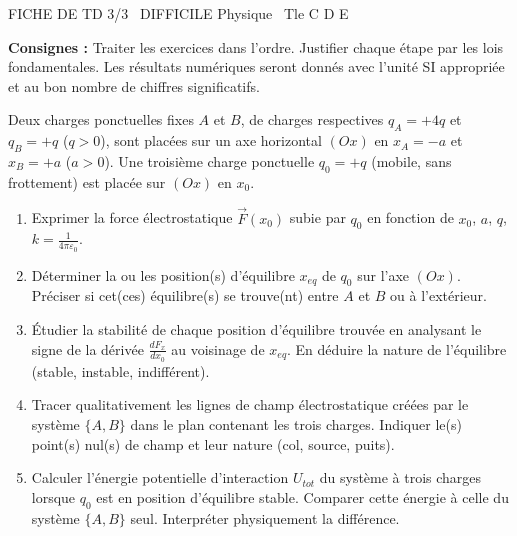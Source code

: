 \documentclass[11pt]{article}
\begin{document}
\begin{tcolorbox}[enhanced,colback=popink,colframe=popink,arc=10pt,boxrule=0pt,left=12pt,right=12pt,top=9pt,bottom=9pt]
{\color{white}\popxbold\small FICHE DE TD 3/3 \textbullet\ DIFFICILE \hfill Physique \textbullet\ Tle C D E\par}
\end{tcolorbox}
\vspace{4pt}
\noindent\textbf{Consignes :} Traiter les exercices dans l'ordre. Justifier chaque étape par les lois fondamentales. Les résultats numériques seront donnés avec l'unité SI appropriée et au bon nombre de chiffres significatifs.

\begin{exercice}
Deux charges ponctuelles fixes $A$ et $B$, de charges respectives $q_A = +4q$ et $q_B = +q$ ($q>0$), sont placées sur un axe horizontal $(Ox)$ en $x_A = -a$ et $x_B = +a$ ($a>0$). Une troisième charge ponctuelle $q_0 = +q$ (mobile, sans frottement) est placée sur $(Ox)$ en $x_0$.
\begin{enumerate}
    \item Exprimer la force électrostatique $\vec{F}(x_0)$ subie par $q_0$ en fonction de $x_0$, $a$, $q$, $k = \frac{1}{4\pi\varepsilon_0}$.
    \item Déterminer la ou les position(s) d'équilibre $x_{eq}$ de $q_0$ sur l'axe $(Ox)$. Préciser si cet(ces) équilibre(s) se trouve(nt) entre $A$ et $B$ ou à l'extérieur.
    \item Étudier la stabilité de chaque position d'équilibre trouvée en analysant le signe de la dérivée $\frac{dF_x}{dx_0}$ au voisinage de $x_{eq}$. En déduire la nature de l'équilibre (stable, instable, indifférent).
    \item Tracer qualitativement les lignes de champ électrostatique créées par le système $\{A, B\}$ dans le plan contenant les trois charges. Indiquer le(s) point(s) nul(s) de champ et leur nature (col, source, puits).
    \item Calculer l'énergie potentielle d'interaction $U_{tot}$ du système à trois charges lorsque $q_0$ est en position d'équilibre stable. Comparer cette énergie à celle du système $\{A, B\}$ seul. Interpréter physiquement la différence.
\end{enumerate}
\end{exercice}
\end{document}
